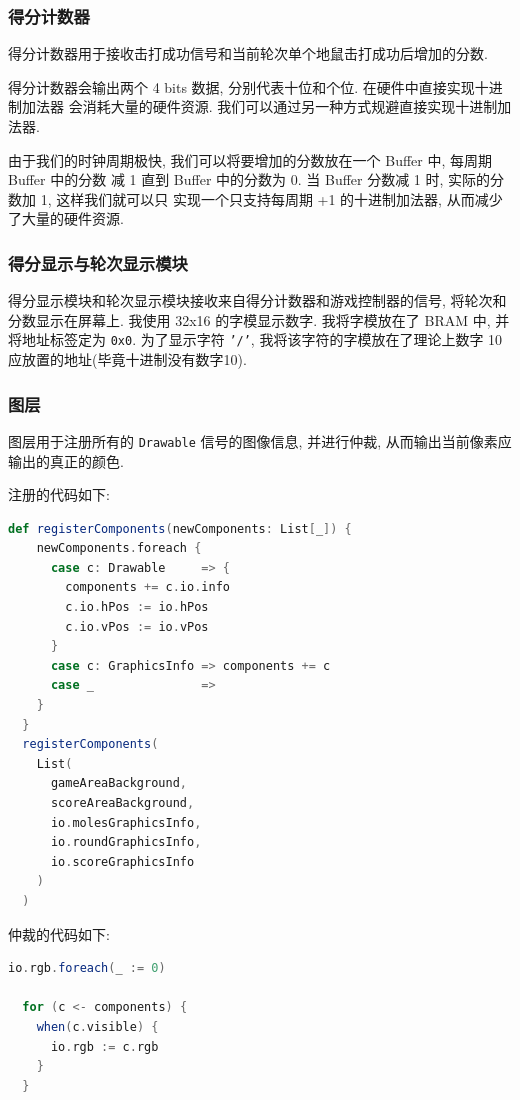 \subsubsection{得分计数器}

得分计数器用于接收击打成功信号和当前轮次单个地鼠击打成功后增加的分数. 

得分计数器会输出两个 4 bits 数据, 分别代表十位和个位. 在硬件中直接实现十进制加法器
会消耗大量的硬件资源. 我们可以通过另一种方式规避直接实现十进制加法器. 

由于我们的时钟周期极快, 我们可以将要增加的分数放在一个 Buffer 中, 每周期 Buffer 中的分数
减 1 直到 Buffer 中的分数为 0. 当 Buffer 分数减 1 时, 实际的分数加 1, 这样我们就可以只
实现一个只支持每周期 +1 的十进制加法器, 从而减少了大量的硬件资源. 

\subsubsection{得分显示与轮次显示模块}

得分显示模块和轮次显示模块接收来自得分计数器和游戏控制器的信号, 将轮次和分数显示在屏幕上. 
我使用 32x16 的字模显示数字. 我将字模放在了 BRAM 中, 并将地址标签定为 \texttt{0x0}. 为了显示字符
\texttt{'/'}, 我将该字符的字模放在了理论上数字 10 应放置的地址(毕竟十进制没有数字10). 

\subsubsection{图层}

图层用于注册所有的 \texttt{Drawable} 信号的图像信息, 并进行仲裁, 从而输出当前像素应输出的真正的颜色.

注册的代码如下: 
\begin{lstlisting}[language=scala]
  def registerComponents(newComponents: List[_]) {
    newComponents.foreach {
      case c: Drawable     => {
        components += c.io.info
        c.io.hPos := io.hPos
        c.io.vPos := io.vPos
      }
      case c: GraphicsInfo => components += c
      case _               =>
    }
  }
  registerComponents(
    List(
      gameAreaBackground,
      scoreAreaBackground,
      io.molesGraphicsInfo,
      io.roundGraphicsInfo,
      io.scoreGraphicsInfo
    )
  )
\end{lstlisting}

仲裁的代码如下: 

\begin{lstlisting}[language=scala]
  io.rgb.foreach(_ := 0)

  for (c <- components) {
    when(c.visible) {
      io.rgb := c.rgb
    }
  }
\end{lstlisting}

